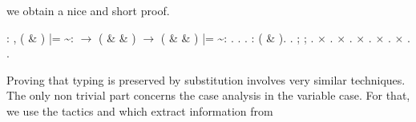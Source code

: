 \documentclass[12pt]{report}
\begin{document}
    we obtain a nice and short proof. \begin{coqdoccode}
\coqdocemptyline
\coqdocnoindent
{}  : \coqdockw{\ensuremath{\forall}}     ,\coqdoceol
\coqdocindent{1.50em}
( \& ) |=  \~{}:  \ensuremath{\rightarrow} \coqdoceol
\coqdocindent{1.50em}
 ( \&  \& ) \ensuremath{\rightarrow}\coqdoceol
\coqdocindent{1.50em}
( \&  \& ) |=  \~{}: .\coqdoceol
\coqdocnoindent
{}.\coqdoceol
\coqdocindent{1.00em}
 .  : ( \& ).  .\coqdoceol
\coqdocindent{1.00em}
 ;    ; .\coqdoceol
\coqdocindent{1.00em}
\ensuremath{\times} . \ensuremath{\times} .\coqdoceol
\coqdocindent{1.00em}
\ensuremath{\times}   . \ensuremath{\times} .\coqdoceol
\coqdocindent{1.00em}
\ensuremath{\times} .\coqdoceol
\coqdocnoindent
{}.\coqdoceol
\coqdocemptyline
\end{coqdoccode}
Proving that typing is preserved by substitution involves very
    similar techniques. The only non trivial part concerns the case
    analysis in the variable case. For that, we use the tactics
     and  which extract information from
\end{document}
